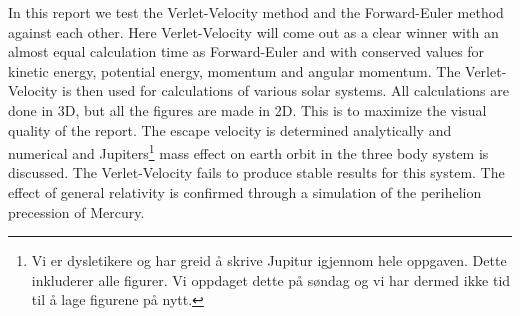 In this report we test the Verlet-Velocity method and the Forward-Euler method against each other. Here Verlet-Velocity will come out as a clear winner with an almost equal calculation time as Forward-Euler and with conserved values for kinetic energy, potential energy, momentum and angular momentum. The Verlet-Velocity is then used for calculations of various solar systems. All calculations are done in 3D, but all the figures are made in 2D. This is to maximize the visual quality of the report. The escape velocity is determined analytically and numerical and Jupiters\footnote{Vi er dysletikere og har greid å skrive Jupitur igjennom hele oppgaven. Dette inkluderer alle figurer. Vi oppdaget dette på søndag og vi har dermed ikke tid til å lage figurene på nytt.} mass effect on earth orbit in the three body system is discussed. The Verlet-Velocity fails to produce stable results for this system. The effect of general relativity is confirmed through a simulation of the perihelion precession of Mercury. 